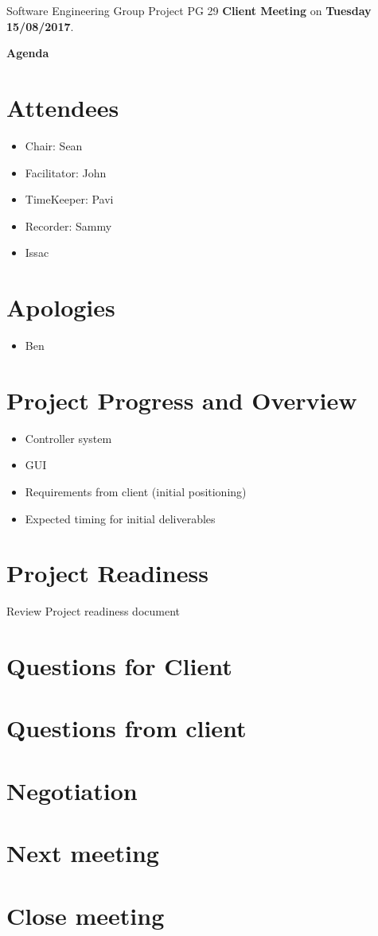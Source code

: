 \documentclass[11pt, a4paper]{article}
\begin{document}
\noindent Software Engineering Group Project PG 29 {\bf Client Meeting} on {\bf Tuesday 15/08/2017}.
\vspace*{10pt}
\begin{center}
\huge \bf Agenda
\end{center}

\section{Attendees}
\begin{itemize}
\item Chair: Sean
\item Facilitator: John
\item TimeKeeper: Pavi
\item Recorder: Sammy
\item Issac
\end{itemize}

\section{Apologies}
\begin{itemize}
\item Ben
\end{itemize}

\section{Project Progress and Overview}
\begin{itemize}
	\item Controller system 
	\item GUI
	\item Requirements from client (initial positioning)
	\item Expected timing for initial deliverables
\end{itemize}

\section{Project Readiness}
Review Project readiness document

\section{Questions for Client}


\section{Questions from client}


\section{Negotiation}


\section{Next meeting}

\section {Close meeting}
\vspace*{10pt}
\end{document}
